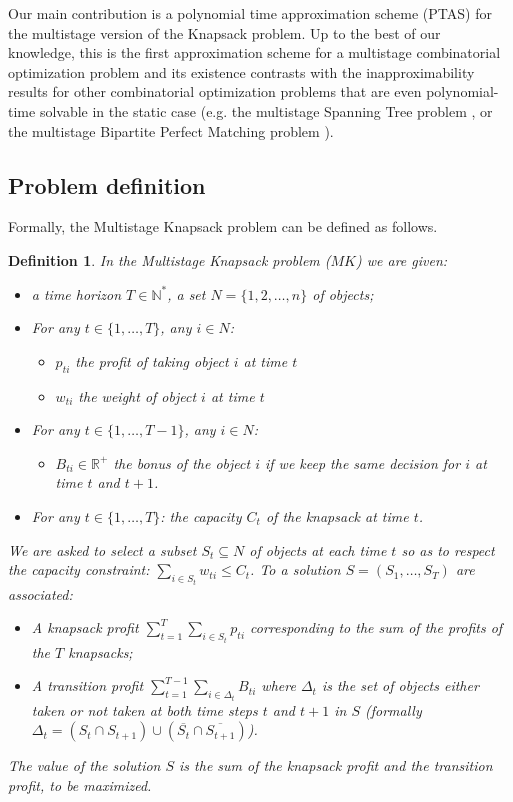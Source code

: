 \documentclass[a4paper]{book}
\newtheorem{definition}{Definition}
\begin{document}
Our main contribution is a polynomial time approximation scheme (PTAS) for the multistage  version of the {\sc Knapsack} problem. Up to the best of our knowledge, this is the first approximation scheme for a multistage combinatorial optimization problem and its existence contrasts with the inapproximability results for other combinatorial optimization problems that are even polynomial-time solvable in the static case (e.g. the {\sc multistage  Spanning Tree} problem \cite{Gupta}, or the {\sc multistage  Bipartite Perfect Matching} problem \cite{Bampis}).

\subsection{Problem definition}
Formally, the {\sc Multistage  Knapsack} problem can be defined as follows.


\begin{definition}
In the {\sc Multistage  Knapsack} problem ($MK$) we are given:
\begin{itemize}
\item a time horizon $T \in \mathbb{N}^*$, a set $N=\{1,2,\dots,n\}$ of objects;
\item For any $t \in \{1,\dots,T\}$, any $i\in N$:
\begin{itemize}
\item $p_{ti}$ the profit of taking object $i$ at time $t$
\item $w_{ti}$ the weight of object $i$ at time $t$
\end{itemize} 
\item For any $t \in \{1,\dots,T-1\}$, any $i\in N$:
\begin{itemize}
    \item $B_{ti}  \in \mathbb{R^{+}}$  the bonus of the object $i$ if we keep the same decision for $i$ at time $t$ and $t+1$. 
\end{itemize}
\item For any $t \in \{1,\dots,T\}$: the capacity $C_t$ of the knapsack at time $t$.
\end{itemize}
We are asked to select a subset $S_t\subseteq N$ of objects at each time $t$ so as to respect the capacity constraint: $\sum_{i\in S_t} w_{ti}\leq C_t$. To a solution $S=(S_1,\dots,S_T)$ are associated:
\begin{itemize}
  \item A knapsack profit $\sum_{t=1}^T\sum_{i\in S_t} p_{ti}$ corresponding to the sum of the profits of the $T$ knapsacks;
  \item A transition profit $\sum\limits_{t=1} ^ {T-1} \sum\limits_{i \in \Delta_t} B_{ti}$ where $\Delta_t$ is the set of objects either taken or not taken at both time steps $t$ and $t+1$ in $S$ (formally $\Delta_t=(S_t\cap S_{t+1})\cup(\overline{S_t}\cap \overline{S_{t+1}})$).\\
  
\end{itemize} 
The value of the solution $S$ is the sum of the knapsack profit and the transition profit, to be maximized.
\end{definition}
\end{document}
